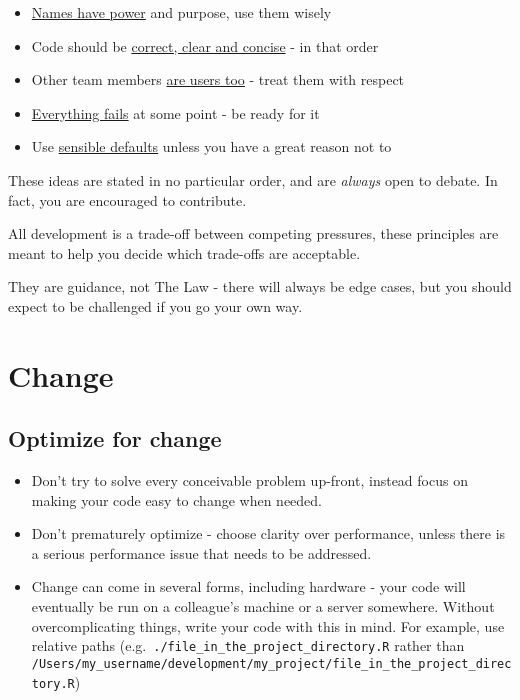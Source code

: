 \documentclass[]{book}
\providecommand{\tightlist}{%
  \setlength{\itemsep}{0pt}\setlength{\parskip}{0pt}}
\begin{document}
\begin{itemize}
\tightlist
\item
  \protect\hyperlink{names}{Names have power} and purpose, use them wisely\\
\item
  Code should be \protect\hyperlink{ccc}{correct, clear and concise} - in that order\\
\item
  Other team members \protect\hyperlink{understand}{are users too} - treat them with respect\\
\item
  \protect\hyperlink{error}{Everything fails} at some point - be ready for it\\
\item
  Use \protect\hyperlink{defaults}{sensible defaults} unless you have a great reason not to
\end{itemize}

These ideas are stated in no particular order, and are \emph{always} open to debate. In fact, you are encouraged to contribute.

All development is a trade-off between competing pressures, these principles are meant to help you decide which trade-offs are acceptable.

They are guidance, not The Law - there will always be edge cases, but you should expect to be challenged if you go your own way.

\hypertarget{change}{%
\section{Change}\label{change}}

\hypertarget{optimize-for-change}{%
\subsection{Optimize for change}\label{optimize-for-change}}

\begin{itemize}
\tightlist
\item
  Don't try to solve every conceivable problem up-front, instead focus on making your code easy to change when needed.
\item
  Don't prematurely optimize - choose clarity over performance, unless there is a serious performance issue that needs to be addressed.
\item
  Change can come in several forms, including hardware - your code will eventually be run on a colleague's machine or a server somewhere. Without overcomplicating things, write your code with this in mind. For example, use relative paths (e.g.~\texttt{./file\_in\_the\_project\_directory.R} rather than \texttt{/Users/my\_username/development/my\_project/file\_in\_the\_project\_directory.R})
\end{itemize}
\end{document}
